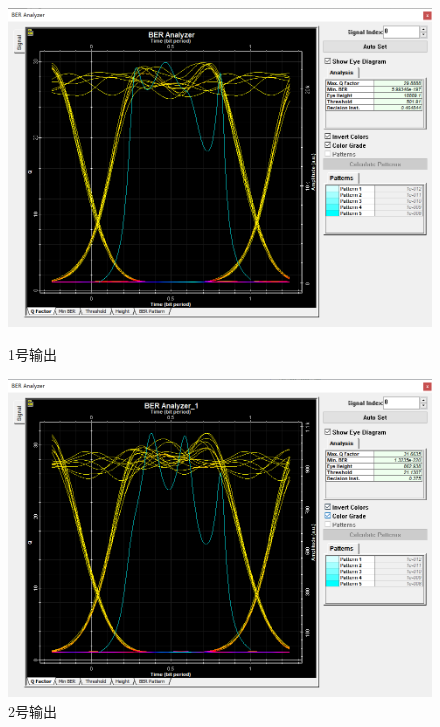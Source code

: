 \documentclass[12pt]{article}
\begin{document}
\begin{figure}[H]
    \begin{minipage}[t]{0.5\linewidth}
        \centering
        \includegraphics[scale=0.5]{sweep2Q1.png}
        \caption{1号输出}
        \label{fig:side:a}
      \end{minipage}%
      \begin{minipage}[t]{0.5\linewidth}
        \centering
        \includegraphics[scale=0.5]{sweep2Q2.png}
        \caption{2号输出}
        \label{fig:side:b}
      \end{minipage}
	  \begin{minipage}[t]{0.5\linewidth}
        \centering

\end{minipage}
\end{figure}
\end{document}
